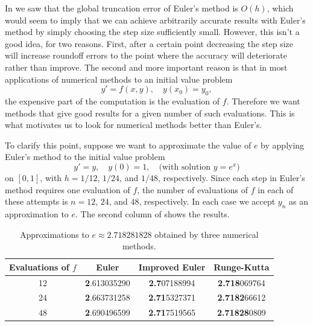 In  we saw that the global truncation error of
Euler's method is $O(h)$, which would seem to imply that we can
achieve arbitrarily accurate results with Euler's method by simply
choosing the step size sufficiently small. However, this
isn't  a good idea, for two reasons. First,
after a certain point decreasing the step size will
increase roundoff errors to the point where the accuracy
will deteriorate rather than improve.
 The second
and more important reason is that in most applications of numerical
methods to an initial value problem
\begin{equation} \label{eq:3.2.1}
y'=f(x,y),\quad y(x_0)=y_0,
\end{equation}
the expensive part of the computation is the evaluation of $f$.
Therefore we want methods that give good results for a given number
of such evaluations. This is what motivates us to look for numerical
methods better than Euler's.

To clarify this point, suppose  we want to approximate the value of $e$
by applying Euler's method to the initial value problem
\[
y'=y,\quad y(0)=1,\quad\text{(with solution $y=e^x$)}
\]
on $[0,1]$, with $h=1/12$, $1/24$, and $1/48$, respectively. Since
each step in Euler's method requires one evaluation of $f$, the number
of evaluations of $f$ in each of these attempts is $n=12$, $24$, and
$48$, respectively. In each case we accept $y_n$ as an approximation
to $e$.  The second column of
 shows the results.

\begin{table}
\caption{Approximations to $e\approx2.718281828$ obtained by three numerical methods.}
\label{table:3.2.1}
\centering
{}
\begin{tabular}{cc cc}\toprule
Evaluations of $f$&Euler&Improved Euler&Runge-Kutta\\ \midrule
12 & \textbf{2}.613035290  &\textbf{2.7}07188994  &\textbf{2.718}069764 \\
24 & \textbf{2}.663731258  &\textbf{2.71}5327371  &\textbf{2.7182}66612 \\
48 & \textbf{2}.690496599  &\textbf{2.71}7519565  &\textbf{2.71828}0809\\
\bottomrule
\end{tabular}
\end{table}

